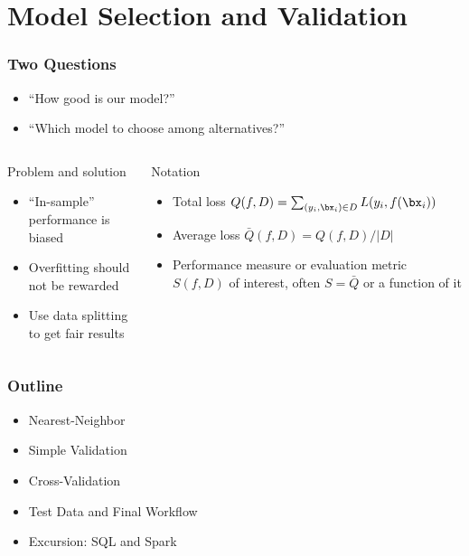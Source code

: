 \section{Model Selection and Validation}

\begin{frame}
	\frametitle{Two Questions}
	
	\begin{itemize}
		\item ``How good is our model?''
		\item ``Which model to choose among alternatives?''
	\end{itemize}
	
	\vfill
	
	\begin{columns}[onlytextwidth]
		\begin{block}{Problem and solution}
			\begin{itemize}
				\item ``In-sample'' performance is biased
				\item Overfitting should not be rewarded
				\item Use data splitting to get fair results
			\end{itemize}
		\end{block}
		
		\begin{alertblock}{Notation}
			\begin{itemize}
				\item Total loss $Q(f, D) = \sum_{(y_i, \bx_i) \in D} L(y_i, f(\bx_i))$
				\item Average loss $\bar Q(f, D) = Q(f, D) / |D|$
				\item Performance measure or evaluation metric $S(f, D)$ of interest, often $S = \bar Q$ or a function of it
			\end{itemize}
		\end{alertblock}
	\end{columns}
\end{frame}

\begin{frame}
	\frametitle{Outline}
	\begin{itemize}
		\item Nearest-Neighbor
		\item Simple Validation 
		\item Cross-Validation
		\item Test Data and Final Workflow
		\item Excursion: SQL and Spark
	\end{itemize}
\end{frame}

